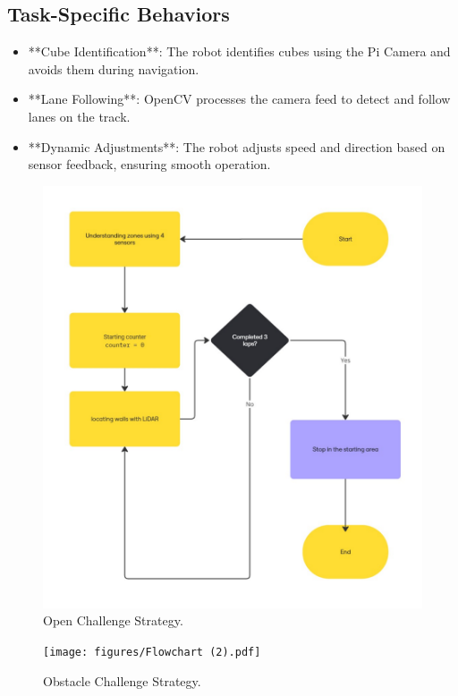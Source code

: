 \documentclass[12pt,a4paper]{article}
\begin{document}
\subsection{Task-Specific Behaviors}
\begin{itemize}
    \item **Cube Identification**: The robot identifies cubes using the Pi Camera and avoids them during navigation.
    \item **Lane Following**: OpenCV processes the camera feed to detect and follow lanes on the track.
    \item **Dynamic Adjustments**: The robot adjusts speed and direction based on sensor feedback, ensuring smooth operation.
\end{itemize}

\begin{figure}
    \centering
    \includegraphics[width=1\linewidth]{Flowchart (3).pdf}
    \caption{Open Challenge Strategy.}
    \label{fig:open}
\end{figure}

\newpage

\begin{figure}
    \centering
    \texttt{[image: figures/Flowchart (2).pdf]}
    \caption{Obstacle Challenge Strategy.}
    \label{fig:obstacle}
\end{figure}
\end{document}
